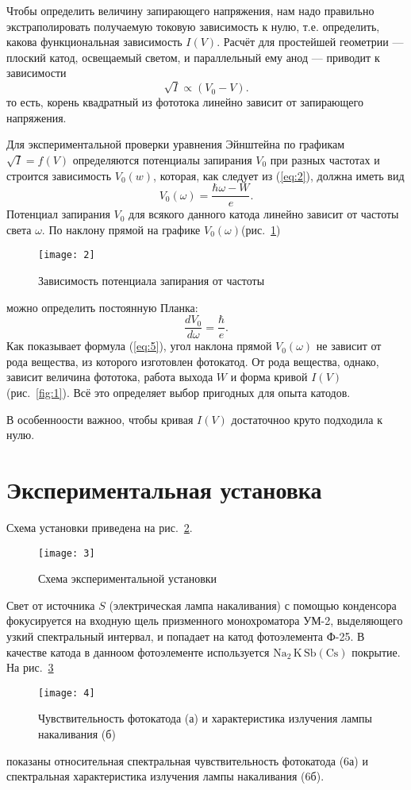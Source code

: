 \documentclass[a4paper]{article}
\begin{document}
Чтобы определить величину запирающего напряжения, нам надо
правильно экстраполировать получаемую токовую зависимость к нулю,
т.\:е. определить, какова функциональная зависимость $I(V)$.
Расчёт для простейшей геометрии --- плоский катод, освещаемый светом,
и параллельный ему анод --- приводит к зависимости
\begin{equation}
	\sqrt{I} \propto (V_0-V)
	\label{eq:3}
.\end{equation}
то есть, корень квадратный из фототока линейно зависит от
запирающего напряжения.

Для экспериментальной проверки уравнения Эйнштейна по графикам
$\sqrt{I} =f(V)$ определяются  потенциалы запирания $V_0$ при
разных частотах и строится зависимость $V_0(w)$, которая, как
следует из (\ref{eq:2}), должна иметь вид
\begin{equation}
	V_0(\omega)=\frac{\hbar \omega-W}{e}
	\label{eq:4}
.\end{equation}
Потенциал запирания $V_0$ для всякого данного катода линейно
зависит от частоты света $\omega$. По наклону прямой на графике
$V_0(\omega)$(рис.~\ref{fig:2})
\begin{figure}[h]
	\centering
	\texttt{[image: 2]}
	\caption{Зависимость потенциала запирания от частоты}
	\label{fig:2}
\end{figure}
можно определить постоянную Планка:
\begin{equation}
	\frac{dV_0}{d\omega}=\frac{\hbar}{e}
	\label{eq:5}
.\end{equation}
Как показывает формула (\ref{eq:5}), угол наклона прямой $V_0(\omega)$
не зависит от рода вещества, из которого изготовлен фотокатод. От
рода вещества, однако, зависит величина фототока, работа выхода
$W$ и форма кривой $I(V)$ (рис.~\ref{fig:1}). Всё это определяет
выбор пригодных для опыта катодов.

В особенноости важноо, чтобы кривая $I(V)$ достаточноо круто
подходила к нулю.
\section{Экспериментальная установка}
Схема установки приведена на рис.~\ref{fig:3}.
\begin{figure}[h]
	\centering
	\texttt{[image: 3]}
	\caption{Схема экспериментальной установки}
	\label{fig:3}
\end{figure}
Свет от источника $S$ (электрическая лампа накаливания) с помощью
конденсора фокусируется на входную щель призменного монохроматора
УМ-2, выделяющего узкий спектральный интервал, и попадает на катод
фотоэлемента Ф-25. В качестве катода в данноом фотоэлементе используется
$\mathrm{Na_2\,K\, Sb(Cs)}$ покрытие. На рис.~\ref{fig:4}
\begin{figure}[h]
	\centering
	\texttt{[image: 4]}
	\caption{Чувствительность фотокатода (а) и характеристика
	излучения лампы накаливания (б)}
	\label{fig:4}
\end{figure}
показаны относительная спектральная чувствительность фотокатода
(6а) и спектральная характеристика излучения лампы накаливания
(6б).
\end{document}
